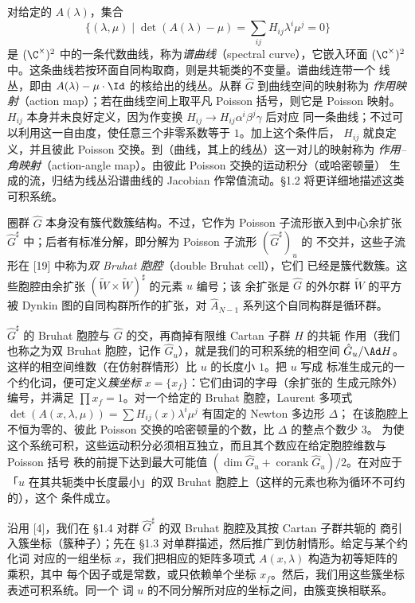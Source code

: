 对给定的 $A(\lambda)$，集合
\[
\{(\lambda,\mu)\mid \det(A(\lambda)-\mu)=\sum_{ij}H_{ij}\lambda^i\mu^j=0\}
\]
是 $(\C^\times)^2$ 中的一条代数曲线，称为\emph{谱曲线}（spectral curve），它嵌入环面
$(\C^\times)^2$ 中。这条曲线若按环面自同构取商，则是共轭类的不变量。谱曲线连带一个
线丛，即由 $A(\lambda)-\mu\cdot\Id$ 的核给出的线丛。从群 $\hat G$ 到曲线空间的映射称为
\emph{作用映射}（action map）；若在曲线空间上取平凡 Poisson 括号，则它是 Poisson 映射。
$H_{ij}$ 本身并未良好定义，因为作变换 $H_{ij}\to H_{ij}\alpha^i\beta^j\gamma$ 后对应
同一条曲线；不过可以利用这一自由度，使任意三个非零系数等于 $1$。加上这个条件后，
$H_{ij}$ 就良定义，并且彼此 Poisson 交换。到（曲线，其上的线丛）这一对儿的映射称为
\emph{作用--角映射}（action-angle map）。由彼此 Poisson 交换的运动积分（或哈密顿量）
生成的流，归结为线丛沿谱曲线的 Jacobian 作常值流动。§1.2 将更详细地描述这类可积系统。

圈群 $\hat G$ 本身没有簇代数簇结构。不过，它作为 Poisson 子流形嵌入到中心余扩张
$\hat G^\sharp$ 中；后者有标准分解，即分解为 Poisson 子流形 $(\hat G^\sharp)_u$ 的
不交并，这些子流形在 [19] 中称为\emph{双 Bruhat 胞腔}（double Bruhat cell），它们
已经是簇代数簇。这些胞腔由余扩张 $(\tilde W\times\tilde W)^\sharp$ 的元素 $u$ 编号；该
余扩张是 $\hat G$ 的外尔群 $\tilde W$ 的平方被 Dynkin 图的自同构群所作的扩张，对
$\hat A_{N-1}$ 系列这个自同构群是循环群。

$\hat G^\sharp$ 的 Bruhat 胞腔与 $\hat G$ 的交，再商掉有限维 Cartan 子群 $H$ 的共轭
作用（我们也称之为双 Bruhat 胞腔，记作 $\hat G_u$），就是我们的可积系统的相空间
$\hat G_u/\Ad H$。这样的相空间维数（在仿射群情形）比 $u$ 的长度小 $1$。把 $u$ 写成
标准生成元的一个约化词，便可定义\emph{簇坐标} $x=\{x_f\}$：它们由词的字母（余扩张的
生成元除外）编号，并满足 $\prod x_f=1$。对一个给定的 Bruhat 胞腔，Laurent 多项式
$\det(A(x,\lambda,\mu))=\sum H_{ij}(x)\lambda^i\mu^j$ 有固定的 Newton 多边形 $\Delta$；
在该胞腔上不恒为零的、彼此 Poisson 交换的哈密顿量的个数，比 $\Delta$ 的整点个数少 $3$。
为使这个系统可积，这些运动积分必须相互独立，而且其个数应在给定胞腔维数与 Poisson 括号
秩的前提下达到最大可能值 $(\dim\hat G_u+\operatorname{corank}\hat G_u)/2$。在对应于
「$u$ 在其共轭类中长度最小」的双 Bruhat 胞腔上（这样的元素也称为循环不可约的），这个
条件成立。

沿用 [4]，我们在 §1.4 对群 $\hat G^\sharp$ 的双 Bruhat 胞腔及其按 Cartan 子群共轭的
商引入簇坐标（簇种子）；先在 §1.3 对单群描述，然后推广到仿射情形。给定与某个约化词
对应的一组坐标 $x$，我们把相应的矩阵多项式 $A(x,\lambda)$ 构造为初等矩阵的乘积，其中
每个因子或是常数，或只依赖单个坐标 $x_f$。然后，我们用这些簇坐标表述可积系统。同一个
词 $u$ 的不同分解所对应的坐标之间，由簇变换相联系。

